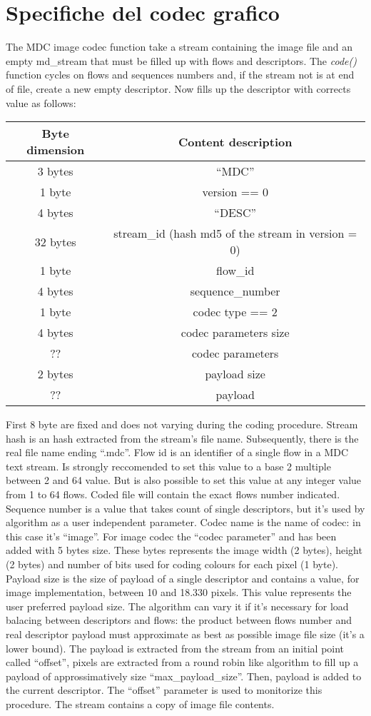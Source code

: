 \section{Specifiche del codec grafico}
The MDC image codec function take a stream containing the image file and an
empty md\_stream that must be filled up with flows and descriptors. The \textit{code()} function
cycles on flows and sequences numbers and, if the stream not is at end of file, create a new empty descriptor.
Now fills up the descriptor with corrects value as follows: 

\begin{center} \begin{tabular}{|c|c|}
\hline
Byte dimension & Content description\\
\hline \hline
3 bytes & ``MDC''\\
1 byte & version == 0\\
4 bytes & ``DESC''\\
32 bytes & stream\_id (hash md5 of the stream in version = 0)\\
1 byte & flow\_id\\
4 bytes & sequence\_number\\
1 byte & codec type == 2\\
4 bytes & codec parameters size\\
?? & codec parameters\\
2 bytes & payload size\\
?? & payload\\
\hline
\end{tabular} \end{center}

First 8 byte are fixed and does not varying during the coding procedure.
Stream hash is an hash extracted from the stream's file name. Subsequently, there is the
real file name ending ``.mdc''. Flow id is an identifier of a single flow in a
MDC text stream. Is strongly reccomended to set this value to a base 2 multiple between 2 and 64 value. But is also possible to set this
value at any integer value from 1 to 64 flows. Coded file will contain the exact flows
number indicated. Sequence number is a value that takes count of single
descriptors, but it's used by algorithm as a user independent parameter. Codec
name is the name of codec: in this case it's ``image''. For image codec the
``codec parameter'' and has been added with 5 bytes size. These bytes represents
the image width (2 bytes), height (2 bytes) and number of bits used for coding colours for each pixel (1 byte). Payload size is the size of payload of a
single descriptor and contains a value, for image implementation, between 10 and 18.330 pixels. This value represents the user preferred
payload size. The algorithm can vary it if it's necessary for load balacing between
descriptors and flows: the product between flows number and real descriptor payload must
approximate as best as possible image file size (it's a lower bound). The
payload is extracted from the stream from an initial point called ``offset'',
pixels are extracted from a round robin like algorithm to fill up a payload of
approssimatively size ``max\_payload\_size''. Then, payload is added to the current descriptor. The ``offset'' parameter is used to monitorize this procedure. The stream contains
a copy of image file contents.

